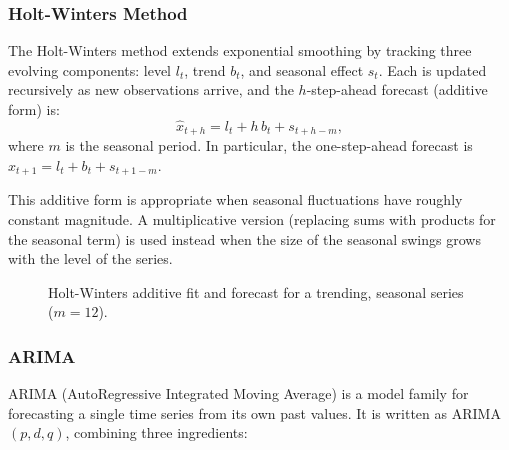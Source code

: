 \documentclass[12pt,a4paper]{article}
\begin{document}
\subsubsection*{Holt-Winters Method}
The Holt-Winters method extends exponential smoothing by tracking three evolving components: level $l_t$, trend $b_t$, and seasonal effect $s_t$. Each is updated recursively as new observations arrive, and the $h$-step-ahead forecast (additive form) is:
$$
\hat{x}_{t+h} = l_t + h\, b_t + s_{t+h-m},
$$
where $m$ is the seasonal period. In particular, the one-step-ahead forecast is $\hat{x}_{t+1} = l_t + b_t + s_{t+1-m}$.

This additive form is appropriate when seasonal fluctuations have roughly constant magnitude. A multiplicative version (replacing sums with products for the seasonal term) is used instead when the size of the seasonal swings grows with the level of the series.
\begin{figure}[h]
	\centering
	\caption{Holt-Winters additive fit and forecast for a trending, seasonal series ($m=12$).}
\end{figure}

\subsubsection*{ARIMA}
ARIMA (AutoRegressive Integrated Moving Average) is a model family for forecasting a single time series from its own past values. It is written as ARIMA$(p,d,q)$, combining three ingredients:
\end{document}
